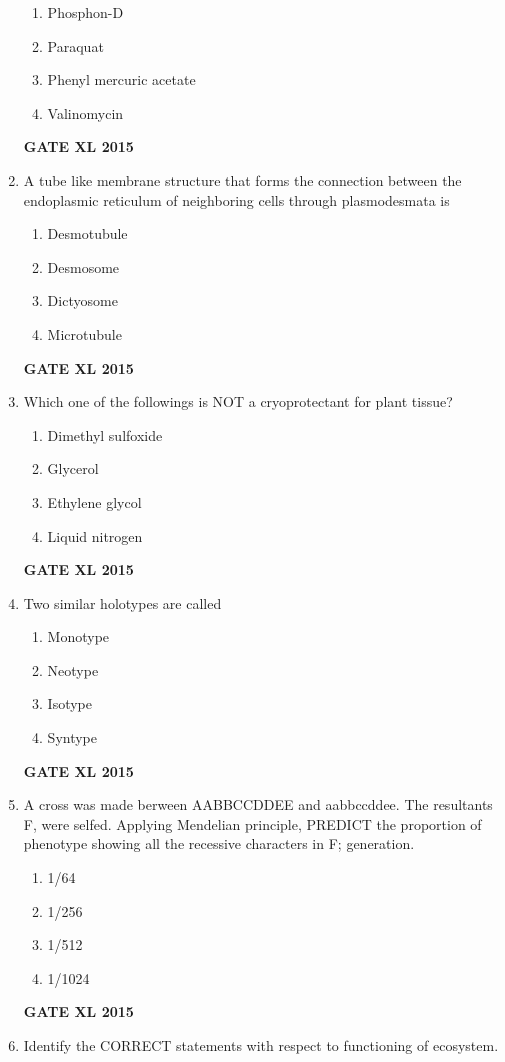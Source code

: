 \documentclass[journal,12pt,onecolumn]{IEEEtran}
\begin{document}
\begin{enumerate}
\begin{enumerate}
            \item Phosphon-D
	    \item Paraquat
	    \item Phenyl mercuric acetate
            \item Valinomycin
    \end{enumerate}
\begin{flushright}\textbf{GATE XL 2015}\end{flushright}
\item A tube like membrane structure that forms the connection between the endoplasmic reticulum of neighboring cells through plasmodesmata is
    \begin{enumerate}
            \item Desmotubule
	    \item Desmosome
	    \item Dictyosome
            \item Microtubule  
    \end{enumerate}
\begin{flushright}\textbf{GATE XL 2015}\end{flushright}
\item Which one of the followings is NOT a cryoprotectant for plant tissue?
    \begin{enumerate}
            \item Dimethyl sulfoxide
	    \item Glycerol
	    \item Ethylene glycol
            \item Liquid nitrogen
    \end{enumerate}
\begin{flushright}\textbf{GATE XL 2015}\end{flushright}
\item Two similar holotypes are called
    \begin{enumerate}
            \item Monotype
	    \item Neotype
	    \item Isotype
            \item Syntype
    \end{enumerate}
\begin{flushright}\textbf{GATE XL 2015}\end{flushright}
\item A cross was made berween AABBCCDDEE and aabbccddee. The resultants F, were selfed. Applying Mendelian principle, PREDICT the proportion of phenotype showing all the recessive characters in F; generation.
    \begin{enumerate}
            \item 1/64
	    \item 1/256
	    \item 1/512
            \item 1/1024
    \end{enumerate}
\begin{flushright}\textbf{GATE XL 2015}\end{flushright}
\item Identify the CORRECT statements with respect to functioning of ecosystem.


\end{enumerate}
\end{document}

